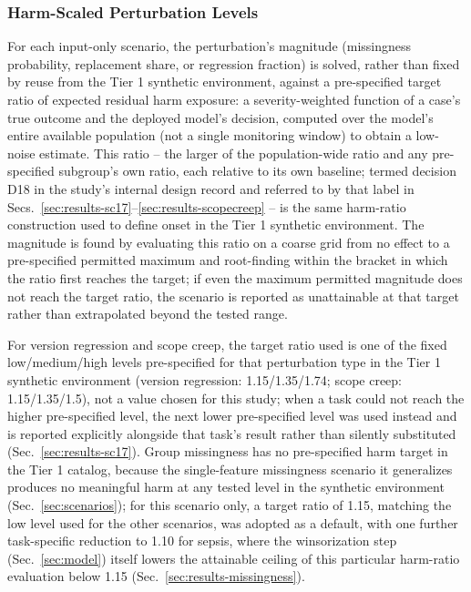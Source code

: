 \documentclass[apajournal,article,submit,oneauthor]{Definitions/mdpi}
\begin{document}
\subsubsection{Harm-Scaled Perturbation Levels}\label{sec:levelsolving}

For each input-only scenario, the perturbation's magnitude (missingness probability, replacement share, or regression fraction) is solved, rather than fixed by reuse from the Tier 1 synthetic environment, against a pre-specified target ratio of expected residual harm exposure: a severity-weighted function of a case's true outcome and the deployed model's decision, computed over the model's entire available population (not a single monitoring window) to obtain a low-noise estimate. This ratio -- the larger of the population-wide ratio and any pre-specified subgroup's own ratio, each relative to its own baseline; termed decision D18 in the study's internal design record and referred to by that label in Secs.~\ref{sec:results-sc17}--\ref{sec:results-scopecreep} -- is the same harm-ratio construction used to define onset in the Tier 1 synthetic environment. The magnitude is found by evaluating this ratio on a coarse grid from no effect to a pre-specified permitted maximum and root-finding within the bracket in which the ratio first reaches the target; if even the maximum permitted magnitude does not reach the target ratio, the scenario is reported as unattainable at that target rather than extrapolated beyond the tested range.

For version regression and scope creep, the target ratio used is one of the fixed low/medium/high levels pre-specified for that perturbation type in the Tier 1 synthetic environment (version regression: 1.15/1.35/1.74; scope creep: 1.15/1.35/1.5), not a value chosen for this study; when a task could not reach the higher pre-specified level, the next lower pre-specified level was used instead and is reported explicitly alongside that task's result rather than silently substituted (Sec.~\ref{sec:results-sc17}). Group missingness has no pre-specified harm target in the Tier 1 catalog, because the single-feature missingness scenario it generalizes produces no meaningful harm at any tested level in the synthetic environment (Sec.~\ref{sec:scenarios}); for this scenario only, a target ratio of 1.15, matching the low level used for the other scenarios, was adopted as a default, with one further task-specific reduction to 1.10 for sepsis, where the winsorization step (Sec.~\ref{sec:model}) itself lowers the attainable ceiling of this particular harm-ratio evaluation below 1.15 (Sec.~\ref{sec:results-missingness}).
\end{document}
